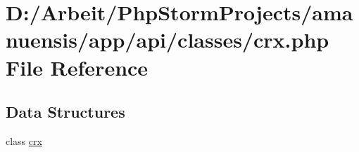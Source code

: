 \hypertarget{crx_8php}{}\section{D\+:/\+Arbeit/\+Php\+Storm\+Projects/amanuensis/app/api/classes/crx.php File Reference}
\label{crx_8php}
\subsection*{Data Structures}
\begin{DoxyCompactItemize}
\item 
class \hyperlink{classcrx}{crx}
\end{DoxyCompactItemize}
